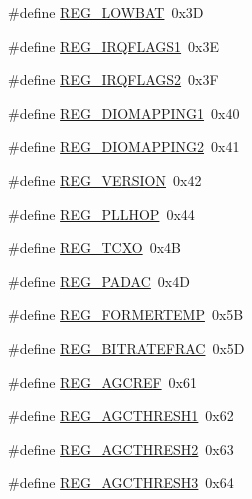 \begin{DoxyCompactItemize}
\item 
\#define \mbox{\hyperlink{sx1276_regs-_fsk_8h_afbb15f7aeaefcb5994a64fff237025f9}{R\+E\+G\+\_\+\+L\+O\+W\+B\+AT}}~0x3D
\item 
\#define \mbox{\hyperlink{sx1276_regs-_fsk_8h_a271d978a9b14435dc5f3d8f3ac9b8951}{R\+E\+G\+\_\+\+I\+R\+Q\+F\+L\+A\+G\+S1}}~0x3E
\item 
\#define \mbox{\hyperlink{sx1276_regs-_fsk_8h_ae93c6dbbf26ea297ba04cbe39c116ff3}{R\+E\+G\+\_\+\+I\+R\+Q\+F\+L\+A\+G\+S2}}~0x3F
\item 
\#define \mbox{\hyperlink{sx1276_regs-_fsk_8h_ac16d5678e98fa6ab73655240a11f9b69}{R\+E\+G\+\_\+\+D\+I\+O\+M\+A\+P\+P\+I\+N\+G1}}~0x40
\item 
\#define \mbox{\hyperlink{sx1276_regs-_fsk_8h_aec8b1ddf72925f502675593fabcc469f}{R\+E\+G\+\_\+\+D\+I\+O\+M\+A\+P\+P\+I\+N\+G2}}~0x41
\item 
\#define \mbox{\hyperlink{sx1276_regs-_fsk_8h_aa7075c0ae73420685bb4278ee580f3fa}{R\+E\+G\+\_\+\+V\+E\+R\+S\+I\+ON}}~0x42
\item 
\#define \mbox{\hyperlink{sx1276_regs-_fsk_8h_a6a8f2748b149c14533e877f06e4720f3}{R\+E\+G\+\_\+\+P\+L\+L\+H\+OP}}~0x44
\item 
\#define \mbox{\hyperlink{sx1276_regs-_fsk_8h_a57f595889f6a6af755ecc9b3bb5b4c3d}{R\+E\+G\+\_\+\+T\+C\+XO}}~0x4B
\item 
\#define \mbox{\hyperlink{sx1276_regs-_fsk_8h_ad64f0f69f548f51e16be4a9a07d980cd}{R\+E\+G\+\_\+\+P\+A\+D\+AC}}~0x4D
\item 
\#define \mbox{\hyperlink{sx1276_regs-_fsk_8h_a1c2bc2d26e0f676a4f012e975f1d86f2}{R\+E\+G\+\_\+\+F\+O\+R\+M\+E\+R\+T\+E\+MP}}~0x5B
\item 
\#define \mbox{\hyperlink{sx1276_regs-_fsk_8h_a1e0117bd4c660d60afc9d119840f9e26}{R\+E\+G\+\_\+\+B\+I\+T\+R\+A\+T\+E\+F\+R\+AC}}~0x5D
\item 
\#define \mbox{\hyperlink{sx1276_regs-_fsk_8h_a3dc004091d7cb3015aff5967e09b77d8}{R\+E\+G\+\_\+\+A\+G\+C\+R\+EF}}~0x61
\item 
\#define \mbox{\hyperlink{sx1276_regs-_fsk_8h_a1d0f8f390ec3b351e10e37e7258ca6df}{R\+E\+G\+\_\+\+A\+G\+C\+T\+H\+R\+E\+S\+H1}}~0x62
\item 
\#define \mbox{\hyperlink{sx1276_regs-_fsk_8h_ac3b7b366f9a287e32a0be6724909f644}{R\+E\+G\+\_\+\+A\+G\+C\+T\+H\+R\+E\+S\+H2}}~0x63
\item 
\#define \mbox{\hyperlink{sx1276_regs-_fsk_8h_a1686f2ccb6d060e425194a9414fd7ca3}{R\+E\+G\+\_\+\+A\+G\+C\+T\+H\+R\+E\+S\+H3}}~0x64
\item 

\end{DoxyCompactItemize}
